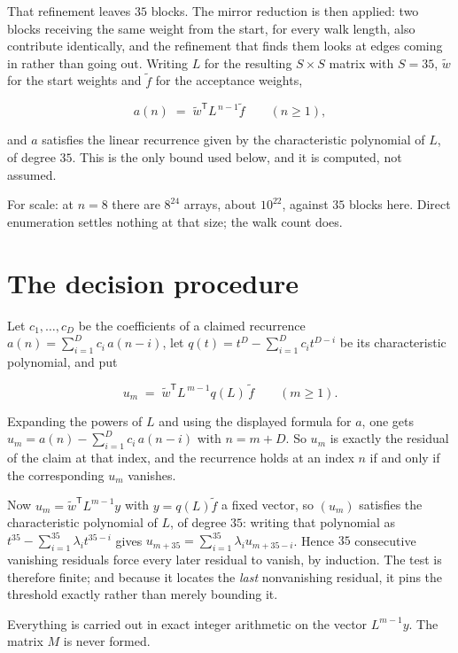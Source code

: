 \documentclass[11pt]{article}
\theoremstyle{definition}
\begin{document}
That refinement leaves $35$ blocks. The mirror reduction is then applied: two blocks receiving the same weight from the start, for every walk length, also contribute identically, and the refinement that finds them looks at edges coming in rather than going out. Writing $L$ for the resulting $S \times S$ matrix with $S = 35$, $\tilde w$ for the start weights and $\tilde f$ for the acceptance weights,

\[a(n) \;=\; \tilde w^{\mathsf T} L^{\,n-1} \tilde f \qquad (n \ge 1),\]

and $a$ satisfies the linear recurrence given by the characteristic polynomial of $L$, of degree $35$. This is the only bound used below, and it is computed, not assumed.

For scale: at $n = 8$ there are $8^{24}$ arrays, about $10^{22}$, against $35$ blocks here. Direct enumeration settles nothing at that size; the walk count does.

\section{The decision procedure}

Let $c_1,\dots,c_D$ be the coefficients of a claimed recurrence $a(n) = \sum_{i=1}^{D} c_i\,a(n-i)$, let $q(t) = t^{D} - \sum_{i=1}^{D} c_i t^{D-i}$ be its characteristic polynomial, and put

\[u_m \;=\; \tilde w^{\mathsf T} L^{\,m-1} q(L)\,\tilde f \qquad (m \ge 1).\]

Expanding the powers of $L$ and using the displayed formula for $a$, one gets $u_m = a(n) - \sum_{i=1}^{D} c_i\,a(n-i)$ with $n = m + D$. So $u_m$ is exactly the residual of the claim at that index, and the recurrence holds at an index $n$ if and only if the corresponding $u_m$ vanishes.

Now $u_m = \tilde w^{\mathsf T} L^{m-1} y$ with $y = q(L)\tilde f$ a fixed vector, so $(u_m)$ satisfies the characteristic polynomial of $L$, of degree $35$: writing that polynomial as $t^{35} - \sum_{i=1}^{35} \lambda_i t^{35-i}$ gives $u_{m+35} = \sum_{i=1}^{35} \lambda_i u_{m+35-i}$. Hence $35$ consecutive vanishing residuals force every later residual to vanish, by induction. The test is therefore finite; and because it locates the {\itshape last} nonvanishing residual, it pins the threshold exactly rather than merely bounding it.

Everything is carried out in exact integer arithmetic on the vector $L^{m-1}y$. The matrix $M$ is never formed.
\end{document}
